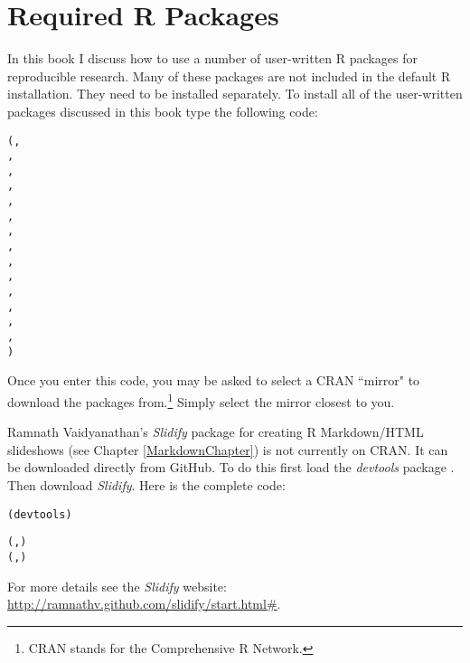 


\chapter*{Required R Packages} \label{ReqPackages}

In this book I discuss how to use a number of user-written R packages for reproducible research. Many of these packages are not included in the default R installation. They need to be installed separately. To install all of the user-written packages discussed in this book type the following code:

\begin{knitrout}
\color{fgcolor}\begin{kframe}
\begin{alltt}
(,
                , 
                , 
                ,
                , 
                ,
                , 
                , 
                , 
                , 
                ,
                ,
                ,                     
                , 
                )
\end{alltt}
\end{kframe}
\end{knitrout}


\noindent Once you enter this code, you may be asked to select a CRAN ``mirror" to download the packages from.\footnote{CRAN stands for the Comprehensive R Network.} Simply select the mirror closest to you.

 Ramnath Vaidyanathan's \emph{Slidify} package \citeyearpar{R-slidify} for creating R Markdown/HTML slideshows (see Chapter \ref{MarkdownChapter}) is not currently on CRAN. It can be downloaded directly from GitHub. To do this first load the \emph{devtools} package \cite[]{R-devtools}. Then download \emph{Slidify}. Here is the complete code:

\begin{knitrout}
\color{fgcolor}\begin{kframe}
\begin{alltt}
(devtools)

(, )
(, )
\end{alltt}
\end{kframe}
\end{knitrout}


\noindent For more details see the \emph{Slidify} website: \url{http://ramnathv.github.com/slidify/start.html#}.



